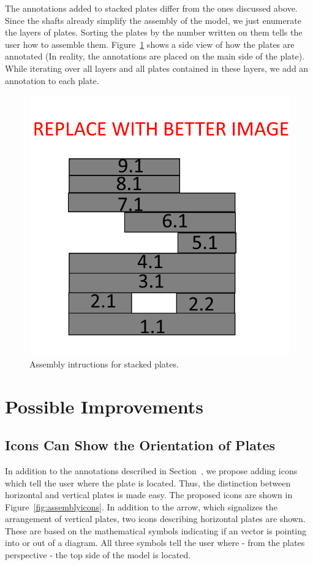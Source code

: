 \documentclass[../ClassicThesis.tex]{subfiles}
\begin{document}
The annotations added to stacked plates differ from the ones discussed above. Since the shafts already simplify the assembly of the model, we just enumerate the layers of plates. Sorting the plates by the number written on them tells the user how to assemble them. Figure~\ref{fig:assemblystacked} shows a side view of how the plates are annotated (In reality, the annotations are placed on the main side of the plate). While iterating over all layers and all plates contained in these layers, we add an annotation to each plate.

\begin{figure}
    \centering
    \includegraphics[width=0.5\columnwidth]{Images/assembly_stacked.png}
    \caption{Assembly intructions for stacked plates.}
    \label{fig:assemblystacked}
\end{figure}

\section{Possible Improvements}\label{sec:assemblyimprovements}
\subsection{Icons Can Show the Orientation of Plates}

In addition to the annotations described in Section~, we propose adding icons which tell the user where the plate is located. Thus, the distinction between horizontal and vertical plates is made easy. The proposed icons are shown in Figure~\ref{fig:assemblyicons}. In addition to the arrow, which signalizes the arrangement of vertical plates, two icons describing horizontal plates are shown. These are based on the mathematical symbols indicating if an vector is pointing into or out of a diagram. All three symbols tell the user where - from the plates perspective - the top side of the model is located.
\end{document}
